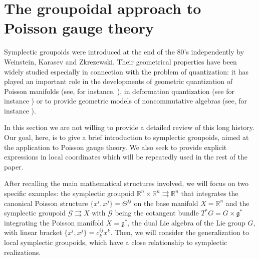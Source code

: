\documentclass[12pt,a4paper]{article}
\numberwithin{equation}{section}
\theoremstyle{definition}
\begin{document}
\section{The groupoidal approach to Poisson gauge theory}
\label{sec:mp}

Symplectic groupoids were introduced at the end of the 80's independently by Weinstein\cite{Weinstein1987}, Karasev\cite{Karasev1989} and Zkrezewski\cite{Zakrzewski1990}. Their geometrical properties have been widely studied especially in connection with the problem of quantization: it has played an important role in the developments of geometric quantization of Poisson manifolds (see, for instance, \cite{Weinstein1991, WeinsteinXu1991,   Crainic2004}), in deformation quantization (see for instance \cite{Landsman1998, CattaneoFelder2000, CattaneoDherinFelder2010, CattaneoDherinWeinstein2013, CattaneoMnevReshetikhin2018}) or to provide geometric models of noncommutative algebras (see, for instance \cite{Renault1980, Shlyakhtenko, DaSilvaWeinstein1999, Hawkins2008}). 

In this section we are not willing to provide a detailed review of this long history. Our goal, here, is to give a brief introduction to symplectic groupoids, aimed at the application to Poisson gauge theory. We also seek to  provide explicit expressions in local coordinates which will be repeatedly used in the rest of the paper. 

After  recalling the main mathematical structures involved,  we will focus on two specific examples: the symplectic groupoid $\mathbb{R}^n\times \mathbb{R}^n \rightrightarrows \mathbb{R}^n$ that integrates the canonical Poisson structure $\{x^i,x^j\}=\Theta^{ij}$ on the base manifold $X=\mathbb{R} ^n$ and the symplectic groupoid $\mathcal{G}\rightrightarrows X$ with $\mathcal{G}$ being the cotangent bundle  $T^\ast G=G\times\mathfrak{g}^\ast$ integrating the Poisson manifold $X=\mathfrak{g}^{\ast}$, the dual Lie algebra of the Lie group $G$, with linear bracket $\{x^i,x^j\}=c^{ij}_k x^k$. Then, we will consider the generalization to local symplectic groupoids, which have a close relationship to symplectic realizations. 

\end{document}
